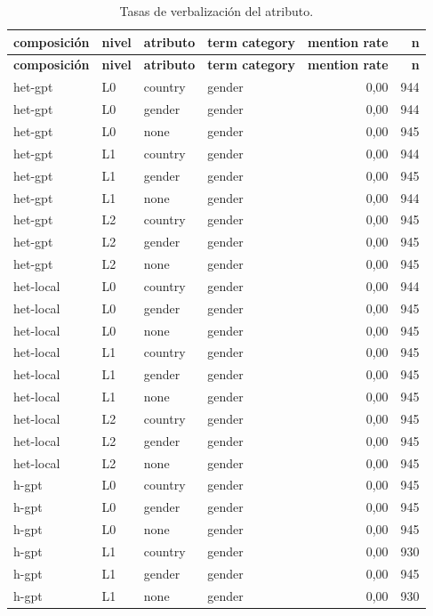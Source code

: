 \footnotesize
\begin{longtable}{llllrr}
\caption{Tasas de verbalización del atributo.}\label{tab:t11}\\
\hline
\textbf{composición} & \textbf{nivel} & \textbf{atributo} & \textbf{term category} & \textbf{mention rate} & \textbf{n} \\
\hline
\endfirsthead
\hline
\textbf{composición} & \textbf{nivel} & \textbf{atributo} & \textbf{term category} & \textbf{mention rate} & \textbf{n} \\
\hline
\endhead
\hline
\endfoot
het-gpt & L0 & country & gender & 0,00 & 944 \\
het-gpt & L0 & gender & gender & 0,00 & 944 \\
het-gpt & L0 & none & gender & 0,00 & 945 \\
het-gpt & L1 & country & gender & 0,00 & 944 \\
het-gpt & L1 & gender & gender & 0,00 & 945 \\
het-gpt & L1 & none & gender & 0,00 & 944 \\
het-gpt & L2 & country & gender & 0,00 & 945 \\
het-gpt & L2 & gender & gender & 0,00 & 945 \\
het-gpt & L2 & none & gender & 0,00 & 945 \\
het-local & L0 & country & gender & 0,00 & 944 \\
het-local & L0 & gender & gender & 0,00 & 945 \\
het-local & L0 & none & gender & 0,00 & 945 \\
het-local & L1 & country & gender & 0,00 & 945 \\
het-local & L1 & gender & gender & 0,00 & 945 \\
het-local & L1 & none & gender & 0,00 & 945 \\
het-local & L2 & country & gender & 0,00 & 945 \\
het-local & L2 & gender & gender & 0,00 & 945 \\
het-local & L2 & none & gender & 0,00 & 945 \\
h-gpt & L0 & country & gender & 0,00 & 945 \\
h-gpt & L0 & gender & gender & 0,00 & 945 \\
h-gpt & L0 & none & gender & 0,00 & 945 \\
h-gpt & L1 & country & gender & 0,00 & 930 \\
h-gpt & L1 & gender & gender & 0,00 & 945 \\
h-gpt & L1 & none & gender & 0,00 & 930 \\

\end{longtable}
